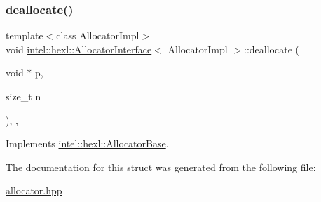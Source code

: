 \subsubsection{\texorpdfstring{deallocate()}{deallocate()}}
{\footnotesize\ttfamily template$<$class Allocator\+Impl$>$ \\
void \hyperlink{structintel_1_1hexl_1_1AllocatorInterface}{intel\+::hexl\+::\+Allocator\+Interface}$<$ Allocator\+Impl $>$\+::deallocate (\begin{DoxyParamCaption}\item[{void $\ast$}]{p,  }\item[{size\+\_\+t}]{n }\end{DoxyParamCaption})\hspace{0.3cm}{\ttfamily [inline]}, {\ttfamily [override]}, {\ttfamily [virtual]}}



Implements \hyperlink{structintel_1_1hexl_1_1AllocatorBase_a0f03686f9b78728d4d228ceaf4c2948e}{intel\+::hexl\+::\+Allocator\+Base}.



The documentation for this struct was generated from the following file\+:\begin{DoxyCompactItemize}
\item 
\hyperlink{allocator_8hpp}{allocator.\+hpp}\end{DoxyCompactItemize}
